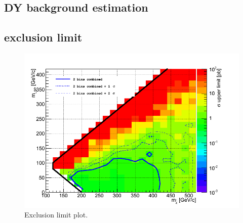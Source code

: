 \subsection{DY background estimation}
\subsection{exclusion limit}
\begin{figure}[htbp]
\centering
\includegraphics[angle=0,scale=0.35]{TauTauFigs/diTau_exclusion.png}
\caption{Exclusion limit plot.}
\label{fig:comparison}
\end{figure}
